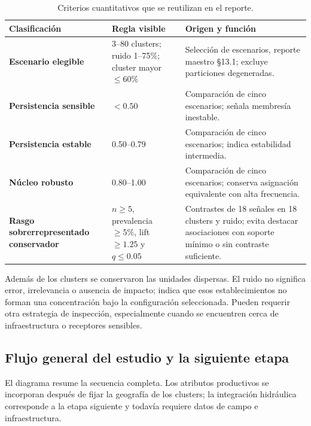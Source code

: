 \documentclass[11pt,letterpaper]{article}
\begin{document}
\begin{table}[H]
\centering\small
\caption{Criterios cuantitativos que se reutilizan en el reporte.}
\begin{tabularx}{\textwidth}{>{\bfseries}p{}p{}X}
\toprule
Clasificación & Regla visible & Origen y función \\
\midrule
Escenario elegible & 3--80 clusters; ruido 1--75\%; cluster mayor $\leq60\%$ & Selección de escenarios, reporte maestro §13.1; excluye particiones degeneradas. \\
Persistencia sensible & $<0.50$ & Comparación de cinco escenarios; señala membresía inestable. \\
Persistencia estable & 0.50--0.79 & Comparación de cinco escenarios; indica estabilidad intermedia. \\
Núcleo robusto & 0.80--1.00 & Comparación de cinco escenarios; conserva asignación equivalente con alta frecuencia. \\
Rasgo sobrerrepresentado conservador & $n\geq5$, prevalencia $\geq5\%$, lift $\geq1.25$ y $q\leq0.05$ & Contrastes de 18 señales en 18 clusters y ruido; evita destacar asociaciones con soporte mínimo o sin contraste suficiente. \\
\bottomrule
\end{tabularx}
\end{table}

Además de los clusters se conservaron las unidades dispersas. El ruido no significa error, irrelevancia o ausencia de impacto; indica que esos establecimientos no forman una concentración bajo la configuración seleccionada. Pueden requerir otra estrategia de inspección, especialmente cuando se encuentren cerca de infraestructura o receptores sensibles.

\subsection*{Flujo general del estudio y la siguiente etapa}

El diagrama resume la secuencia completa. Los atributos productivos se incorporan después de fijar la geografía de los clusters; la integración hidráulica corresponde a la etapa siguiente y todavía requiere datos de campo e infraestructura.
\end{document}
